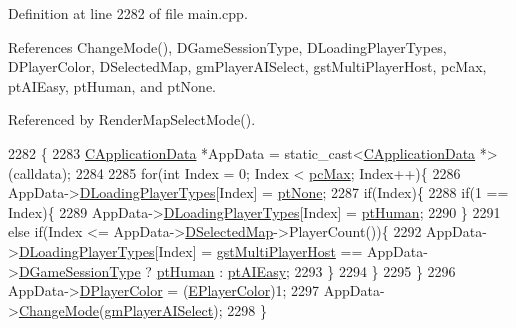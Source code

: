 Definition at line 2282 of file main.\+cpp.



References Change\+Mode(), D\+Game\+Session\+Type, D\+Loading\+Player\+Types, D\+Player\+Color, D\+Selected\+Map, gm\+Player\+A\+I\+Select, gst\+Multi\+Player\+Host, pc\+Max, pt\+A\+I\+Easy, pt\+Human, and pt\+None.



Referenced by Render\+Map\+Select\+Mode().


\begin{DoxyCode}
2282                                                             \{
2283     \hyperlink{classCApplicationData}{CApplicationData} *AppData = \textcolor{keyword}{static\_cast<}\hyperlink{classCApplicationData}{CApplicationData} *\textcolor{keyword}{>}(calldata);
2284  
2285     \textcolor{keywordflow}{for}(\textcolor{keywordtype}{int} Index = 0; Index < \hyperlink{GameDataTypes_8h_aafb0ca75933357ff28a6d7efbdd7602fa594a5c8dd3987f24e8a0f23f1a72cd34}{pcMax}; Index++)\{
2286         AppData->\hyperlink{classCApplicationData_a2ac5711b027842d57aa5f8e5a7adc589}{DLoadingPlayerTypes}[Index] = \hyperlink{classCApplicationData_ae04b6b340297311972ce1e955196fcaaa091de1adaa447ed15f9f6bb25f0880f7}{ptNone};
2287         \textcolor{keywordflow}{if}(Index)\{
2288             \textcolor{keywordflow}{if}(1 == Index)\{
2289                 AppData->\hyperlink{classCApplicationData_a2ac5711b027842d57aa5f8e5a7adc589}{DLoadingPlayerTypes}[Index] = \hyperlink{classCApplicationData_ae04b6b340297311972ce1e955196fcaaaf06f9bc64db8860bc03ecc330b11f234}{ptHuman};
2290             \}
2291             \textcolor{keywordflow}{else} \textcolor{keywordflow}{if}(Index <= AppData->\hyperlink{classCApplicationData_abf74a18394e479b7090a8f9a55608867}{DSelectedMap}->PlayerCount())\{
2292                 AppData->\hyperlink{classCApplicationData_a2ac5711b027842d57aa5f8e5a7adc589}{DLoadingPlayerTypes}[Index] = 
      \hyperlink{classCApplicationData_a0ec00515bf6b4b469b43ad62d615e3faa9ce51c30b802a2fc5f1c587829b20673}{gstMultiPlayerHost} == AppData->\hyperlink{classCApplicationData_acd2cc6f5bbb325532c21afc38241c3de}{DGameSessionType} ?  
      \hyperlink{classCApplicationData_ae04b6b340297311972ce1e955196fcaaaf06f9bc64db8860bc03ecc330b11f234}{ptHuman} : \hyperlink{classCApplicationData_ae04b6b340297311972ce1e955196fcaaa94da5a073589347212dc8f08c02a17a5}{ptAIEasy};
2293             \}
2294         \}
2295     \}
2296     AppData->\hyperlink{classCApplicationData_a53550939b20cba70570f113e4d1c5d02}{DPlayerColor} = (\hyperlink{GameDataTypes_8h_aafb0ca75933357ff28a6d7efbdd7602f}{EPlayerColor})1;
2297     AppData->\hyperlink{classCApplicationData_aee18c113e9a0acb3cad3d63eb19de71b}{ChangeMode}(\hyperlink{classCApplicationData_ac8ac37a4c8bb871036fbbdc6a072e403a01258bbe3c3588b79ba150d1106b34b9}{gmPlayerAISelect});
2298 \}
\end{DoxyCode}
